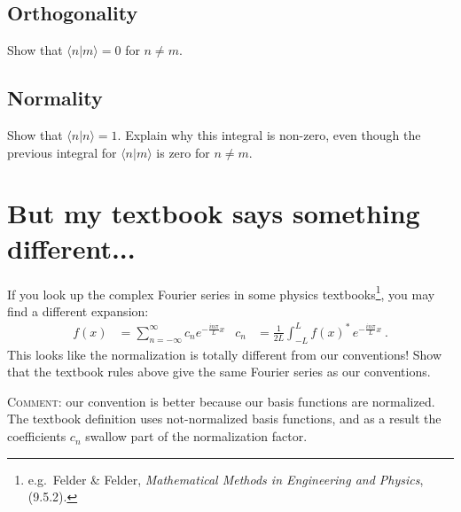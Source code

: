 \documentclass[12pt]{article}
\numberwithin{equation}{section}    %
\begin{document}
\subsection{Orthogonality}
Show that $\langle n|m\rangle = 0$ for $n\neq m$.

\subsection{Normality}
Show that $\langle n | n\rangle =1$. Explain why this integral is non-zero, even though the previous integral for $\langle n|m\rangle$ is zero for $n\neq m$. 

\section{But my textbook says something different...}

If you look up the complex Fourier series in some physics textbooks\footnote{e.g.\ Felder \& Felder, \emph{Mathematical Methods in Engineering and Physics},  (9.5.2).}, you may find a different expansion:
\begin{align}
	f(x) &= \sum_{n=-\infty}^\infty c_n e^{-\frac{in\pi}{L} x}
	&
	c_n &= \frac{1}{2L} \int_{-L}^L f(x)^* \, e^{-\frac{in\pi}{L} x} \ .
\end{align}
This looks like the normalization is totally different from our conventions! Show that the textbook rules above give the same Fourier series as our conventions. 

\textsc{Comment:} our convention is better because our basis functions are normalized. The textbook definition uses not-normalized basis functions, and as a result the coefficients $c_n$ swallow part of the normalization factor.
\end{document}

